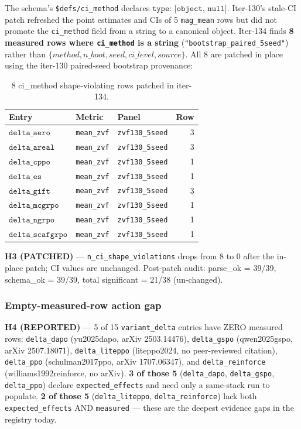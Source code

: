 The schema's \texttt{\$defs/ci\_method} declares $\texttt{type: [object, null]}$.
Iter-130's stale-CI patch refreshed the point estimates and CIs of 5
\texttt{mag\_mean} rows but did not promote the \texttt{ci\_method} field
from a string to a canonical object. Iter-134 finds \textbf{8 measured rows
where \texttt{ci\_method} is a string} (\texttt{"bootstrap\_paired\_5seed"})
rather than $\{method, n\_boot, seed, ci\_level, source\}$. All 8 are
patched in place using the iter-130 paired-seed bootstrap provenance:

\begin{table}[h]
\centering
\small
\begin{tabular}{lllr}
\toprule
\textbf{Entry} & \textbf{Metric} & \textbf{Panel} & \textbf{Row} \\
\midrule
$\texttt{delta\_aero}$     & \texttt{mean\_zvf} & \texttt{zvf130\_5seed} & 3 \\
$\texttt{delta\_areal}$    & \texttt{mean\_zvf} & \texttt{zvf130\_5seed} & 3 \\
$\texttt{delta\_cppo}$     & \texttt{mean\_zvf} & \texttt{zvf130\_5seed} & 1 \\
$\texttt{delta\_es}$       & \texttt{mean\_zvf} & \texttt{zvf130\_5seed} & 1 \\
$\texttt{delta\_gift}$     & \texttt{mean\_zvf} & \texttt{zvf130\_5seed} & 3 \\
$\texttt{delta\_mcgrpo}$   & \texttt{mean\_zvf} & \texttt{zvf130\_5seed} & 1 \\
$\texttt{delta\_ngrpo}$    & \texttt{mean\_zvf} & \texttt{zvf130\_5seed} & 1 \\
$\texttt{delta\_scafgrpo}$ & \texttt{mean\_zvf} & \texttt{zvf130\_5seed} & 1 \\
\bottomrule
\end{tabular}
\caption{8 ci\_method shape-violating rows patched in iter-134.}
\label{tab:p6-iter134-ci-shape}
\end{table}

\textbf{H3 (PATCHED)} --- \texttt{n\_ci\_shape\_violations} drops from
8 to 0 after the in-place patch; CI values are unchanged. Post-patch
audit: parse\_ok = 39/39, schema\_ok = 39/39, total significant = 21/38
(un-changed).

\subsubsection{Empty-measured-row action gap}
\label{sec:p6-iter134-empty-action-gap}

\textbf{H4 (REPORTED)} --- 5 of 15 \texttt{variant\_delta} entries have
ZERO measured rows: \texttt{delta\_dapo} (yu2025dapo, arXiv 2503.14476),
\texttt{delta\_gspo} (qwen2025gspo, arXiv 2507.18071),
\texttt{delta\_liteppo} (liteppo2024, no peer-reviewed citation),
\texttt{delta\_ppo} (schulman2017ppo, arXiv 1707.06347), and
\texttt{delta\_reinforce} (williams1992reinforce, no arXiv).
\textbf{3 of those 5} (\texttt{delta\_dapo}, \texttt{delta\_gspo},
\texttt{delta\_ppo}) declare \texttt{expected\_effects} and need only a
same-stack run to populate. \textbf{2 of those 5}
(\texttt{delta\_liteppo}, \texttt{delta\_reinforce}) lack both
\texttt{expected\_effects} AND \texttt{measured} --- these are the
deepest evidence gaps in the registry today.

